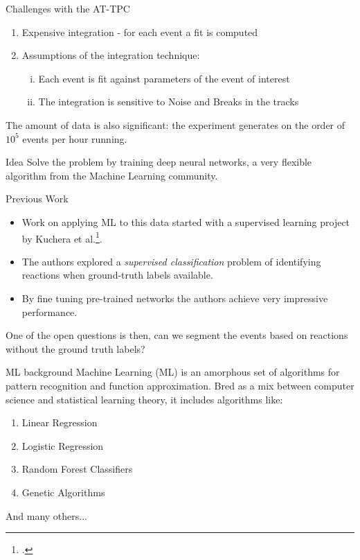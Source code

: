\documentclass{beamer}
\begin{document}
\begin{frame}[t]{Challenges with the AT-TPC}
	\begin{enumerate}[I]
		\item Expensive integration - for each event a fit is computed
		\item Assumptions of the integration technique: 
			\begin{enumerate}[(i)]
				\item Each event is fit against parameters of the event of interest
				\item The integration is sensitive to Noise and Breaks in the tracks
			\end{enumerate}
	\end{enumerate}
	The amount of data is also significant: the experiment generates on the order of $10^5$ events per hour running.
	\begin{block}{Idea}
		Solve the problem by training deep neural networks, a very flexible algorithm from the Machine Learning community.
	\end{block}
\end{frame}

\begin{frame}[t]{Previous Work}
	\begin{itemize}
		\item Work on applying ML to this data started with a supervised learning project by Kuchera et al.\footcite{Kuchera2019}.
		\item The authors explored a \textit{supervised classification} problem of identifying reactions when ground-truth labels available.
		\item By fine tuning pre-trained networks the authors achieve very impressive performance.
	\end{itemize}
	One of the open questions is then, can we segment the events based on reactions without the ground truth labels?
\end{frame}

\begin{frame}[t]{ML background}
	Machine Learning (ML) is an amorphous set of algorithms for pattern recognition and function approximation. Bred as a mix between computer science and statistical learning theory, it includes algorithms like: 
	\begin{enumerate}[I]
		\item Linear Regression
		\item Logistic Regression
		\item Random Forest Classifiers
		\item Genetic Algorithms 
	\end{enumerate}
	And many others...
\end{frame}
\end{document}

